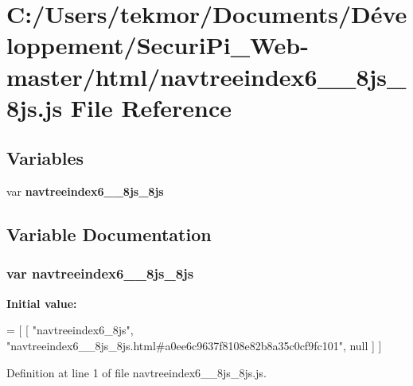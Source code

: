 \section{C\+:/\+Users/tekmor/\+Documents/\+Développement/\+Securi\+Pi\+\_\+\+Web-\/master/html/navtreeindex6\+\_\+\+\_\+8js\+\_\+8js.js File Reference}
\label{navtreeindex6____8js__8js_8js}
\subsection*{Variables}
\begin{DoxyCompactItemize}
\item 
var {\bf navtreeindex6\+\_\+\+\_\+8js\+\_\+8js}
\end{DoxyCompactItemize}


\subsection{Variable Documentation}
\subsubsection[{navtreeindex6\+\_\+\+\_\+8js\+\_\+8js}]{\setlength{\rightskip}{0pt plus 5cm}var navtreeindex6\+\_\+\+\_\+8js\+\_\+8js}\label{navtreeindex6____8js__8js_8js_aba9cb14c30fcbddf80baef86c36dff41}
{\bfseries Initial value\+:}
\begin{DoxyCode}
=
[
    [ \textcolor{stringliteral}{"navtreeindex6\_8js"}, \textcolor{stringliteral}{"navtreeindex6\_\_8js\_8js.html#a0ee6c9637f8108e82b8a35c0cf9fc101"}, null ]
]
\end{DoxyCode}


Definition at line 1 of file navtreeindex6\+\_\+\+\_\+8js\+\_\+8js.\+js.

